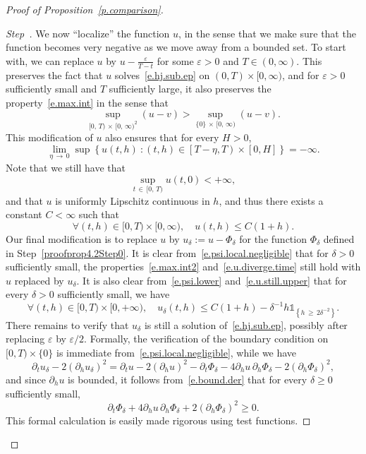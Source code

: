 \documentclass[AHL,Unicode,longabstracts,published]{cedram}
\newcommand{\1}{\mathds{1}}
\newcommand{\ep}{\varepsilon}
\renewcommand{\le}{\leqslant}
\renewcommand{\ge}{\geqslant}
\newcommand{\de}{\delta}
\newcounter{stepcount}
\newenvironment{step}{\refstepcounter{stepcount}\begin{proof}[Step~\thestepcount]}{\let\qed\relax\end{proof}}
\let\oldforall\forall
\renewcommand*{\forall}{\mathrel{\oldforall}}
\begin{document}
\begin{proof}[Proof of Proposition~\ref{p.comparison}]
\begin{step}\label{proofprop4.2Step2}
We now ``localize'' the function $u$, in the sense that we make sure that the function becomes very negative as we move away from a bounded set. To start with, we can replace $u$ by $u-\tfrac{\ep}{T-t}$ for some $\ep > 0$ and $T \in (0,\infty)$. This preserves the fact that $u$ solves~\eqref{e.hj.sub.ep} on $(0,T)\times [0,\infty)$, and for $\ep > 0$ sufficiently small and $T$ sufficiently large, it also preserves the property~\eqref{e.max.int} in the sense that
\begin{equation}\label{e.max.int2}
\sup_{[0,\,T)\,\times\,[0,\,\infty)^2} (u-v) > \sup_{\{0\}\,\times \,[0,\,\infty)} (u-v).
\end{equation}
This modification of $u$ also ensures that for every $H > 0$,
\begin{equation}\label{e.u.diverge.time}
\lim_{\eta\,\to\,0} \sup \left\{u(t,h) \ : (t,h) \in \left[T - \eta,T\right) \times [0, H]\right\} = -\infty.
\end{equation}
Note that we still have that
\[
\sup_{t\,\in\,[0,\,T)} u(t,0) < + \infty,
\]
and that $u$ is uniformly Lipschitz continuous in $h$, and thus there exists a constant $C < \infty$ such that
\begin{equation}\label{e.u.still.upper}
\forall (t,h) \in [0,T)\times [0,\infty), \quad u(t,h) \le C(1+h).
\end{equation}
Our final modification is to replace $u$ by $u_\de := u-\Phi_\de$ for the function $\Phi_\de$ defined in Step~\ref{proofprop4.2Step0}. It is clear from~\eqref{e.psi.local.negligible} that for $\delta > 0$ sufficiently small, the properties~\eqref{e.max.int2} and~\eqref{e.u.diverge.time} still hold with $u$ replaced by $u_\de$. It is also clear from~\eqref{e.psi.lower} and~\eqref{e.u.still.upper} that for every $\de > 0$ sufficiently small, we have
\begin{equation}\label{e.u.goes.down}
\forall (t,h) \in [0,T)\times [0,+\infty), \quad u_\de(t,h) \le C(1+h)- \de^{-1} h \1_{\left\{h\,\ge\,2\de^{-2}\right\}}.
\end{equation}
There remains to verify that $u_\delta$ is still a solution of~\eqref{e.hj.sub.ep}, possibly after replacing $\ep$ by $\ep/2$. Formally, the verification of the boundary condition on $[0,T)\times \{0\}$ is immediate from~\eqref{e.psi.local.negligible}, while we have
\[
\partial_t u_\delta - 2 \left(\partial_h u_\delta\right)^2 = \partial_t u - 2 \left(\partial_h u\right)^2 - \partial_t \Phi_\delta - 4 \partial_h u \, \partial_h \Phi_\delta - 2 \left(\partial_h \Phi_\delta\right)^2,
\]
and since $\partial_h u$ is bounded, it follows from~\eqref{e.bound.der} that for every $\delta \ge 0$ sufficiently small,
\[
\partial_t \Phi_\delta + 4 \partial_h u \, \partial_h \Phi_\delta + 2 \left(\partial_h \Phi_\delta\right)^2 \ge 0.
\]
This formal calculation is easily made rigorous using test functions.


\end{step}
\end{proof}
\end{document}

